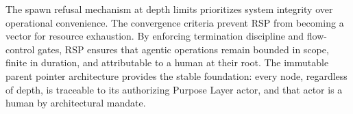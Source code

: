 The spawn refusal mechanism at depth limits prioritizes system integrity over operational convenience. The convergence criteria prevent RSP from becoming a vector for resource exhaustion. By enforcing termination discipline and flow-control gates, RSP ensures that agentic operations remain bounded in scope, finite in duration, and attributable to a human at their root. The immutable parent pointer architecture provides the stable foundation: every node, regardless of depth, is traceable to its authorizing Purpose Layer actor, and that actor is a human by architectural mandate.
